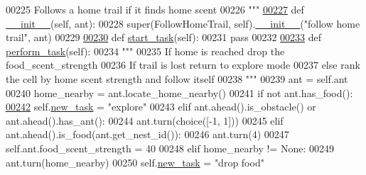 \begin{DoxyCode}
00225 \textcolor{stringliteral}{    Follows a home trail if it finds home scent }
00226 \textcolor{stringliteral}{    """}
\hypertarget{task__manager_8py_source_l00227}{}\hyperlink{classtask__manager_1_1FollowHomeTrail_a644c02e687f8a412a39e81628742f3b5}{00227}     \textcolor{keyword}{def }\hyperlink{classtask__manager_1_1FollowHomeTrail_a644c02e687f8a412a39e81628742f3b5}{\_\_init\_\_}(self, ant):
00228         super(FollowHomeTrail, self).\hyperlink{classtask__manager_1_1FollowHomeTrail_a644c02e687f8a412a39e81628742f3b5}{\_\_init\_\_}(\textcolor{stringliteral}{"follow home trail"}, ant)
00229 
\hypertarget{task__manager_8py_source_l00230}{}\hyperlink{classtask__manager_1_1FollowHomeTrail_a0ffd4aabfafcfead05a02e149e5fab91}{00230}     \textcolor{keyword}{def }\hyperlink{classtask__manager_1_1FollowHomeTrail_a0ffd4aabfafcfead05a02e149e5fab91}{start\_task}(self):
00231         \textcolor{keywordflow}{pass}
00232 
\hypertarget{task__manager_8py_source_l00233}{}\hyperlink{classtask__manager_1_1FollowHomeTrail_ae4386ef7470e20e3f42fab9fc65b70cb}{00233}     \textcolor{keyword}{def }\hyperlink{classtask__manager_1_1FollowHomeTrail_ae4386ef7470e20e3f42fab9fc65b70cb}{perform\_task}(self):
00234         \textcolor{stringliteral}{"""}
00235 \textcolor{stringliteral}{            If home is reached drop the food\_scent\_strength}
00236 \textcolor{stringliteral}{            If trail is lost return to explore mode}
00237 \textcolor{stringliteral}{            else rank the cell by home scent strength and follow itself}
00238 \textcolor{stringliteral}{        """}
00239         ant = self.ant
00240         home\_nearby = ant.locate\_home\_nearby()
00241         \textcolor{keywordflow}{if} \textcolor{keywordflow}{not} ant.has\_food():
\hypertarget{task__manager_8py_source_l00242}{}\hyperlink{classtask__manager_1_1FollowHomeTrail_aae7878e14c1b1aeeac617e2e03074705}{00242}             self.\hyperlink{classtask__manager_1_1Task_af16658f4c3c447e24f73ed3d1803e058}{new\_task} = \textcolor{stringliteral}{"explore"}
00243         \textcolor{keywordflow}{elif} ant.ahead().is\_obstacle() \textcolor{keywordflow}{or} ant.ahead().has\_ant():
00244             ant.turn(choice([-1, 1]))
00245         \textcolor{keywordflow}{elif} ant.ahead().is\_food(ant.get\_nest\_id()):
00246             ant.turn(4)
00247             self.ant.food\_scent\_strength = 40
00248         \textcolor{keywordflow}{elif} home\_nearby != \textcolor{keywordtype}{None}:
00249             ant.turn(home\_nearby)
00250             self.\hyperlink{classtask__manager_1_1Task_af16658f4c3c447e24f73ed3d1803e058}{new\_task} = \textcolor{stringliteral}{"drop food"}

\end{DoxyCode}
